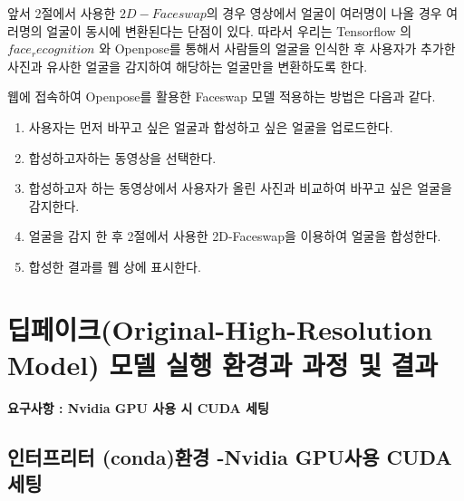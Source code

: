 \documentclass{oblivoir}
\begin{document}
앞서 2절에서 사용한 $2D-Faceswap$의 경우 영상에서 얼굴이 여러명이 나올 경우 여러명의 얼굴이 동시에 변환된다는 단점이 있다. 따라서 우리는 Tensorflow 의 $face_recognition$ 와 Openpose를 통해서 사람들의 얼굴을 인식한 후 사용자가 추가한 사진과 유사한 얼굴을 감지하여 해당하는 얼굴만을 변환하도록 한다.

웹에 접속하여 Openpose를 활용한 Faceswap 모델 적용하는 방법은 다음과 같다.

\begin{enumerate}
    \item 사용자는 먼저 바꾸고 싶은 얼굴과 합성하고 싶은 얼굴을 업로드한다.
    \item 합성하고자하는 동영상을 선택한다.
    \item 합성하고자 하는 동영상에서 사용자가 올린 사진과 비교하여 바꾸고 싶은 얼굴을 감지한다.
    \item 얼굴을 감지 한 후 2절에서 사용한 2D-Faceswap을 이용하여 얼굴을 합성한다.
    \item 합성한 결과를 웹 상에 표시한다.
\end{enumerate}

\section{딥페이크(Original-High-Resolution Model) 모델 실행 환경과 과정 및 결과}

\textbf{요구사항 : Nvidia GPU 사용 시 CUDA 세팅}


\subsection{인터프리터 (conda)환경 -Nvidia GPU사용 CUDA 세팅}
\end{document}
